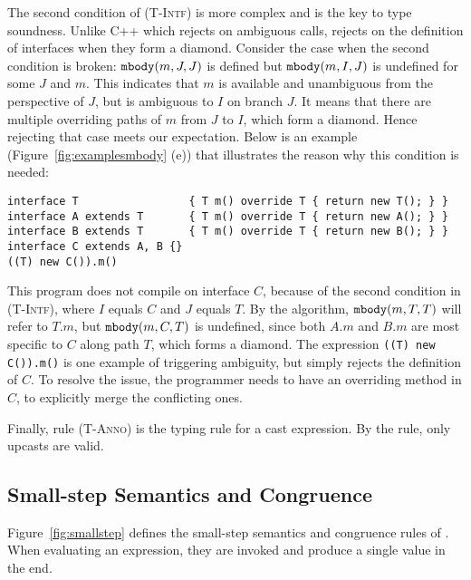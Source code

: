 The second condition of \textsc{(T-Intf)} is more complex and is the key to type soundness. Unlike C++ which rejects on ambiguous calls,
\MIM{} rejects on the definition of interfaces when they form a diamond. Consider the case when the second condition is broken: $\texttt{mbody}(m, J, J)$
is defined but $\texttt{mbody}(m, I, J)$ is undefined for some $J$ and $m$. This indicates that $m$ is available and unambiguous from the perspective of $J$,
but is ambiguous to $I$ on branch $J$. It means that there are multiple overriding paths of $m$ from $J$ to $I$, which form a diamond. Hence rejecting
that case meets our expectation. Below is an example (Figure~\ref{fig:examplesmbody} (e)) that illustrates the reason why this condition is needed:
\begin{lstlisting}
interface T                 { T m() override T { return new T(); } }
interface A extends T       { T m() override T { return new A(); } }
interface B extends T       { T m() override T { return new B(); } }
interface C extends A, B {}
((T) new C()).m()
\end{lstlisting}
This program does not compile on interface $C$, because of the second condition in \textsc{(T-Intf)}, where $I$ equals $C$ and $J$ equals $T$.
By the algorithm, $\texttt{mbody}(m, T, T)$ will refer to $T.m$, but $\texttt{mbody}(m, C, T)$ is undefined, since both $A.m$ and $B.m$ are most specific
to $C$ along path $T$, which forms a diamond. The expression \lstinline|((T) new C()).m()| is one example of triggering ambiguity, but \MIM{}
simply rejects the definition of $C$. To resolve the issue, the programmer needs to have an overriding method in $C$, to explicitly merge
the conflicting ones.

Finally, rule \textsc{(T-Anno)} is the typing rule for a cast expression. By the rule, only upcasts are valid.

\subsection{Small-step Semantics and Congruence}
Figure~\ref{fig:smallstep} defines the small-step semantics and
congruence rules of \MIM{}. When evaluating an expression, they
are invoked and produce a single value in
the end. %

